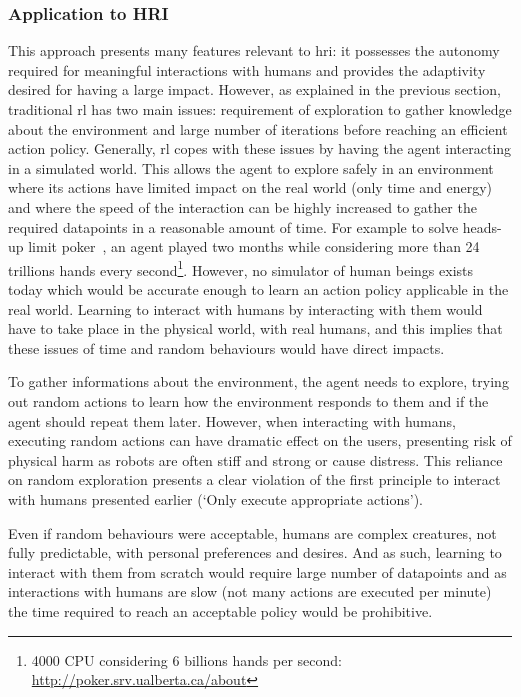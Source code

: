 	\subsubsection{Application to HRI}
	
	This approach presents many features relevant to \gls{hri}: it possesses the autonomy required for meaningful interactions with humans and provides the adaptivity desired for having a large impact. However, as explained in the previous section, traditional \gls{rl} has two main issues: requirement of exploration to gather knowledge about the environment and large number of iterations before reaching an efficient action policy. Generally, \gls{rl} copes with these issues by having the agent interacting in a simulated world. This allows the agent to explore safely in an environment where its actions have limited impact on the real world (only time and energy) and where the speed of the interaction can be highly increased to gather the required datapoints in a reasonable amount of time. For example to solve heads-up limit poker~\citep{bowling2015heads}, an agent played two months while considering more than 24 trillions hands every second\footnote{4000 CPU considering 6 billions hands per second: \url{http://poker.srv.ualberta.ca/about}}. However, no simulator of human beings exists today which would be accurate enough to learn an action policy applicable in the real world. Learning to interact with humans by interacting with them would have to take place in the physical world, with real humans, and this implies that these issues of time and random behaviours would have direct impacts. 
	
	To gather informations about the environment, the agent needs to explore, trying out random actions to learn how the environment responds to them and if the agent should repeat them later. However, when interacting with humans, executing random actions can have dramatic effect on the users, presenting risk of physical harm as robots are often stiff and strong or cause distress. This reliance on random exploration presents a clear violation of the first principle to interact with humans presented earlier (`Only execute appropriate actions').
	
	Even if random behaviours were acceptable, humans are complex creatures, not fully predictable, with personal preferences and desires. And as such, learning to interact with them from scratch would require large number of datapoints and as interactions with humans are slow (not many actions are executed per minute) the time required to reach an acceptable policy would be prohibitive. 
	
